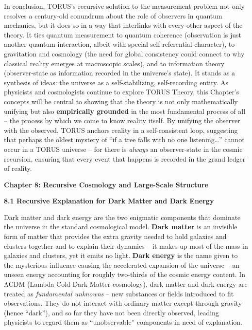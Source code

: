 In conclusion, TORUS's recursive solution to the measurement problem not
only resolves a century-old conundrum about the role of observers in
quantum mechanics, but it does so in a way that interlinks with every
other aspect of the theory. It ties quantum measurement to quantum
coherence (observation is just another quantum interaction, albeit with
special self-referential character), to gravitation and cosmology (the
need for global consistency could connect to why classical reality
emerges at macroscopic scales), and to information theory
(observer-state as information recorded in the universe's state). It
stands as a synthesis of ideas: the universe as a self-stabilizing,
self-recording entity. As physicists and cosmologists continue to
explore TORUS Theory, this Chapter's concepts will be central to showing
that the theory is not only mathematically unifying but also
\textbf{empirically grounded} in the most fundamental process of all --
the process by which we come to know reality itself. By unifying the
observer with the observed, TORUS anchors reality in a self-consistent
loop, suggesting that perhaps the oldest mystery of ``if a tree falls
with no one listening\ldots{}'' cannot occur in a TORUS universe -- for
there is \emph{always} an observer-state in the cosmic recursion,
ensuring that every event that happens is recorded in the grand ledger
of reality.

\textbf{Chapter 8: Recursive Cosmology and Large-Scale Structure}

\textbf{8.1 Recursive Explanation for Dark Matter and Dark Energy}

Dark matter and dark energy are the two enigmatic components that
dominate the universe in the standard cosmological model. \textbf{Dark
matter} is an invisible form of matter that provides the extra gravity
needed to hold galaxies and clusters together and to explain their
dynamics -- it makes up most of the mass in galaxies and clusters, yet
it emits no light​. \textbf{Dark energy} is the name given to the
mysterious influence causing the accelerated expansion of the universe
-- an unseen energy accounting for roughly two-thirds of the cosmic
energy content. In ΛCDM (Lambda Cold Dark Matter cosmology), dark matter
and dark energy are treated as \emph{fundamental unknowns} -- new
substances or fields introduced to fit observations. They do not
interact with ordinary matter except through gravity (hence ``dark''),
and so far they have not been directly observed, leading physicists to
regard them as ``unobservable'' components in need of explanation.

